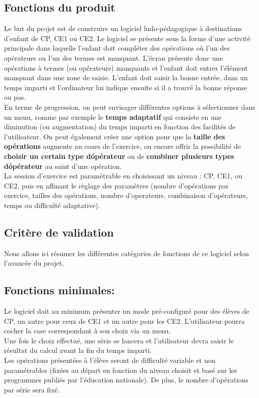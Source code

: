 \documentclass[a4paper,11pt]{report} %
\begin{document}
\subsection{Fonctions du produit}

Le but du projet est de construire un logiciel ludo-pédagogique à destinations d'enfant de CP, CE1 ou CE2. Le logiciel se présente sous la forme d'une activité principale dans laquelle l'enfant doit compléter des opérations où l'un des opérateurs ou l'un des termes est manquant. L'écran présente donc une opérations à termes (ou opérateurs) manquants et l'enfant doit entrer l'élément manquant dans une zone de saisie. L'enfant doit saisir la bonne entrée, dans un temps imparti et l'ordinateur lui indique ensuite si il a trouvé la bonne réponse ou pas. \\

En terme de progression, on peut envisager différentes options à sélectionner dans un menu, comme par exemple le \textbf{temps adaptatif} qui consiste en une diminution (ou augmentation) du temps imparti en fonction des facilités de l'utilisateur. On peut également créer une option pour que la \textbf{taille des opérations} augmente au cours de l'exercice, ou encore offrir la possibilité de \textbf{choisir un certain type d\'opérateur} ou de \textbf{combiner plusieurs types d\'opérateur} au saint d'une opération. \\


La session d'exercice est paramétrable en choisissant un niveau : CP, CE1, ou CE2, puis en affinant le règlage des paramètres (nombre d'opérations par exercice, tailles des opérations, nombre d'operateurs, combinaison d'opérateurs, temps ou difficulté adaptative).

\subsection{Critère de validation}

Nous allons ici résumer les différentes catégories de fonctions de ce logiciel selon l'avancée du projet.\\

\subsection{Fonctions minimales:}
Le logiciel doit au minimum présenter un mode pré-configuré pour des élèves de CP, un autre pour ceux de CE1 et un autre pour les CE2. L'utilisateur pourra cocher la case correspondant à son choix via un menu.\\
Une fois le choix effectué, une série se lancera et l'utilisateur devra saisir le résultat du calcul avant la fin du temps imparti.\\
Les opérations présentées à l'élève seront de difficulté variable et non paramétrables (fixées au départ en fonction du niveau choisit et basé sur les programmes publiés par l'éducation nationale).
De plus, le nombre d'opérations par série sera fixé.
\end{document}
